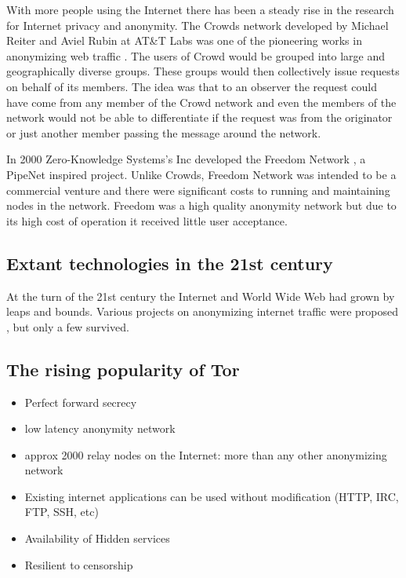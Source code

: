 \documentclass{llncs}
\begin{document}
With more people using the Internet there has been a steady rise in the research for Internet privacy and anonymity. The Crowds network developed by Michael Reiter and Aviel Rubin at AT\&T Labs was one of the pioneering works in anonymizing web traffic \cite{crowds:tissec}. The users of Crowd would be grouped into large and geographically diverse groups. These groups would then collectively issue requests on behalf of its members. The idea was that to an observer the request could have come from any member of the Crowd network and even the members of the network would not be able to differentiate if the request was from the originator or just another member passing the message around the network.

In 2000 Zero-Knowledge Systems's Inc developed the Freedom Network \cite{freedom2-arch}, a PipeNet inspired project. Unlike Crowds, Freedom Network was intended to be a commercial venture and there were significant costs to running and maintaining nodes in the network. Freedom was a high quality anonymity network but due to its high cost of operation it received little user acceptance.


\subsection{Extant technologies in the 21st century}

At the turn of the 21st century the Internet and World Wide Web had grown by leaps and bounds. Various projects on anonymizing internet traffic were proposed \cite{goldberg97privacyenhancing} \cite{fiveyearslater}, but only a few survived. 
\subsection{The rising popularity of Tor}
\begin{itemize}
	\item{Perfect forward secrecy}
	\item{low latency anonymity network}
	\item{approx 2000 relay nodes on the Internet: more than any other anonymizing network}
	\item{Existing internet applications can be used without modification (HTTP, IRC, FTP, SSH, etc)}
	\item{Availability of Hidden services}
	\item{Resilient to censorship}
\end{itemize}
\end{document}
